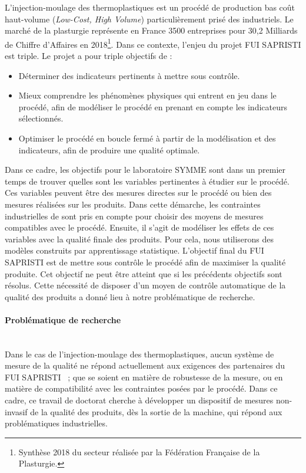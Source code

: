 L'injection-moulage des thermoplastiques est un procédé de production bas coût haut-volume (\textit{Low-Cost, High Volume}) particulièrement prisé des industriels. Le marché de la plasturgie représente en France 3500 entreprises pour 30,2 Milliards de Chiffre d'Affaires en 2018\footnote{Synthèse 2018 du secteur réalisée par la Fédération Française de la Plasturgie.}. Dans ce contexte, l’enjeu du projet FUI SAPRISTI est triple. Le projet a pour triple objectifs de :
\begin{itemize}
	\item Déterminer des indicateurs pertinents à mettre sous contrôle.
	\item Mieux comprendre les phénomènes physiques qui entrent en jeu dans le procédé, afin de modéliser le procédé en prenant en compte les indicateurs sélectionnés.
	\item Optimiser le procédé en boucle fermé à partir de la modélisation et des indicateurs, afin de produire une qualité optimale.
\end{itemize}

Dans ce cadre, les objectifs pour le laboratoire SYMME sont dans un premier temps de trouver quelles sont les variables pertinentes à étudier sur le procédé.
Ces variables peuvent être des mesures directes sur le procédé ou bien des mesures réalisées sur les produits.
Dans cette démarche, les contraintes industrielles de sont pris en compte pour choisir des moyens de mesures compatibles avec le procédé.
Ensuite, il s'agit de modéliser les effets de ces variables avec la qualité finale des produits.
Pour cela, nous utiliserons des modèles construits par apprentissage statistique.
L'objectif final du FUI SAPRISTI est de mettre sous contrôle le procédé afin de maximiser la qualité produite.
Cet objectif ne peut être atteint que si les précédents objectifs sont résolus.
Cette nécessité de disposer d'un moyen de contrôle automatique de la qualité des produits a donné lieu à notre problématique de recherche.

\bigskip
\paragraph{Problématique de recherche}\mbox{} \\

Dans le cas de l’injection-moulage des thermoplastiques, aucun système de mesure de la qualité ne répond actuellement aux exigences des partenaires du FUI SAPRISTI \ ; que se soient en matière de robustesse de la mesure, ou en matière de compatibilité avec les contraintes posées par le procédé.
Dans ce cadre, ce travail de doctorat cherche à développer un dispositif de mesures non-invasif de la qualité des produits, dès la sortie de la machine, qui répond aux problématiques industrielles.

